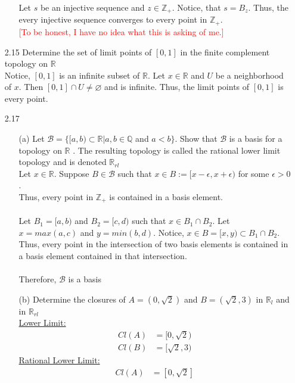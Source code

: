 \documentclass[12pt]{article}
\newcommand{\Z}{\mathds{Z}}
\newcommand{\R}{\mathds{R}}
\newcommand{\B}{\mathcal{B}}
\begin{document}
\begin{enumerate}
\begin{enumerate}
		Let $ s $ be an injective sequence and $ z\in\Z_+ $. Notice, that $ s = B_z $. Thus, the every injective sequence converges to every point in $ \Z_+ $.\\
		\textcolor{red}{[To be honest, I have no idea what this is asking of me.]}
	\end{enumerate}
	\item[2.15] Determine the set of limit points of $[ 0,1 ]$ in the finite complement topology on $ \R $\\
	Notice, $ [0,1] $ is an infinite subset of $ \R $. Let $x\in\R $ and $U$ be a neighborhood of $ x $. Then $ [0,1]\cap U \not = \varnothing$ and is infinite. Thus, the limit points of $ [0,1] $ is every point.
	\item[2.17] 
		\begin{enumerate}
			\item[(a)] Let $\mathcal { B } = \{ [ a , b ) \subset \mathbb { R } | a , b \in \mathbb { Q }$ and $a < b \} .$ Show that $\mathcal { B }$ is a basis for a topology on $\mathbb { R }$ . The resulting topology is called the rational lower limit topology and is denoted $\mathbb { R } _ { r l }$\\
			Let $ x\in\R $. Suppose $ B \in \B $ such that $ x\in B := [x-\epsilon,x+\epsilon) $ for some $ \epsilon > 0 $.\\
			Thus, every point in $ \Z_+ $ is contained in a basis element.\\
			\\
			Let $ B_1=[a,b) $ and $ B_2 = [c,d) $ such that $ x \in B_1\cap B_2 $. Let $ x = max(a,c) $ and $ y = min(b,d) $. Notice, $ x \in B = [x,y) \subset B_1\cap B_2 $. \\
			Thus, every point in the intersection of two basis elements is contained in a basis element contained in that intersection.\\
			\\
			Therefore, $ \B $ is a basis
			\item[(b)] Determine the closures of $A = ( 0 , \sqrt { 2 } )$ and $B = ( \sqrt { 2 } , 3 )$ in $\mathbb { R } _ { l }$ and in $\mathbb { R } _ { r l }$\\
			\underline{Lower Limit:}
			\begin{align*}
				 Cl(A) &= [0,\sqrt{2})\\
				 Cl(B) &= [\sqrt{2},3)
			\end{align*}
			\underline{Rational Lower Limit:}
			\begin{align*}
			Cl(A) &= [0,\sqrt{2}]\\

\end{align*}
\end{enumerate}
\end{enumerate}
\end{document}
